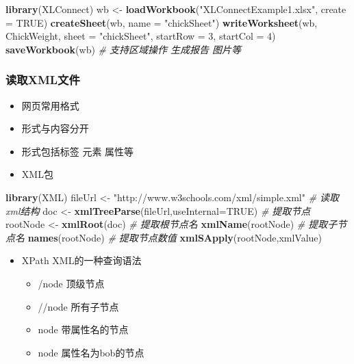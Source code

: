 \documentclass[
]{book}
\newenvironment{Shaded}{\begin{snugshade}}{\end{snugshade}}
\newcommand{\CommentTok}[1]{\textcolor[rgb]{0.56,0.35,0.01}{\textit{#1}}}
\newcommand{\DataTypeTok}[1]{\textcolor[rgb]{0.13,0.29,0.53}{#1}}
\newcommand{\DecValTok}[1]{\textcolor[rgb]{0.00,0.00,0.81}{#1}}
\newcommand{\KeywordTok}[1]{\textcolor[rgb]{0.13,0.29,0.53}{\textbf{#1}}}
\newcommand{\NormalTok}[1]{#1}
\newcommand{\OtherTok}[1]{\textcolor[rgb]{0.56,0.35,0.01}{#1}}
\newcommand{\StringTok}[1]{\textcolor[rgb]{0.31,0.60,0.02}{#1}}
\providecommand{\tightlist}{%
  \setlength{\itemsep}{0pt}\setlength{\parskip}{0pt}}
\begin{document}
\begin{Shaded}
\begin{Highlighting}[]
\KeywordTok{library}\NormalTok{(XLConnect)}
\NormalTok{wb <-}\StringTok{ }\KeywordTok{loadWorkbook}\NormalTok{(}\StringTok{"XLConnectExample1.xlsx"}\NormalTok{, }\DataTypeTok{create =} \OtherTok{TRUE}\NormalTok{)}
\KeywordTok{createSheet}\NormalTok{(wb, }\DataTypeTok{name =} \StringTok{"chickSheet"}\NormalTok{)}
\KeywordTok{writeWorksheet}\NormalTok{(wb, ChickWeight, }\DataTypeTok{sheet =} \StringTok{"chickSheet"}\NormalTok{, }\DataTypeTok{startRow =} \DecValTok{3}\NormalTok{, }\DataTypeTok{startCol =} \DecValTok{4}\NormalTok{)}
\KeywordTok{saveWorkbook}\NormalTok{(wb)}
\CommentTok{# 支持区域操作 生成报告 图片等}
\end{Highlighting}
\end{Shaded}

\hypertarget{ux8bfbux53d6xmlux6587ux4ef6}{%
\subsubsection{读取XML文件}\label{ux8bfbux53d6xmlux6587ux4ef6}}

\begin{itemize}
\tightlist
\item
  网页常用格式
\item
  形式与内容分开
\item
  形式包括标签 元素 属性等
\item
  XML包
\end{itemize}

\begin{Shaded}
\begin{Highlighting}[]
\KeywordTok{library}\NormalTok{(XML)}
\NormalTok{fileUrl <-}\StringTok{ "http://www.w3schools.com/xml/simple.xml"}
\CommentTok{# 读取xml结构}
\NormalTok{doc <-}\StringTok{ }\KeywordTok{xmlTreeParse}\NormalTok{(fileUrl,}\DataTypeTok{useInternal=}\OtherTok{TRUE}\NormalTok{)}
\CommentTok{# 提取节点}
\NormalTok{rootNode <-}\StringTok{ }\KeywordTok{xmlRoot}\NormalTok{(doc)}
\CommentTok{# 提取根节点名}
\KeywordTok{xmlName}\NormalTok{(rootNode)}
\CommentTok{# 提取子节点名}
\KeywordTok{names}\NormalTok{(rootNode) }
\CommentTok{# 提取节点数值}
\KeywordTok{xmlSApply}\NormalTok{(rootNode,xmlValue)}
\end{Highlighting}
\end{Shaded}

\begin{itemize}
\tightlist
\item
  XPath XML的一种查询语法

  \begin{itemize}
  \tightlist
  \item
    /node 顶级节点
  \item
    //node 所有子节点
  \item
    node\citep{attr-name} 带属性名的节点
  \item
    node\citep[=`bob']{attr-name} 属性名为bob的节点
  \end{itemize}
\end{itemize}
\end{document}
